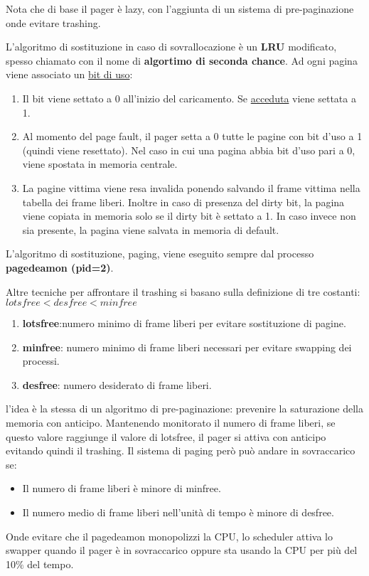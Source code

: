 \documentclass{article}
\begin{document}
\noindent Nota che di base il pager è lazy, con l'aggiunta di un sistema di pre-paginazione onde evitare trashing.
\medskip

\noindent L'algoritmo di sostituzione in caso di sovrallocazione è un \textbf{LRU} modificato, spesso chiamato con il nome di \textbf{algortimo di seconda chance}.
Ad ogni pagina viene associato un \underline{bit di uso}:
\begin{enumerate}
    \item Il bit viene settato a 0 all'inizio del caricamento. Se \underline{acceduta} viene settata a 1.
    \item Al momento del page fault, il pager setta a 0 tutte le pagine con bit d'uso a 1 (quindi viene resettato). Nel caso in cui una pagina abbia bit d'uso pari a 0,
    viene spostata in memoria centrale. 
    \item La pagine vittima viene resa invalida ponendo salvando il frame vittima nella tabella dei frame liberi. Inoltre in caso di presenza del dirty bit, la pagina viene copiata
    in memoria solo se il dirty bit è settato a 1. In caso invece non sia presente, la pagina viene salvata in memoria di default.
\end{enumerate}

\noindent L'algoritmo di sostituzione, paging, viene eseguito sempre dal processo \textbf{pagedeamon (pid=2)}.
\medskip

Altre tecniche per affrontare il trashing si basano sulla definizione di tre costanti: $lotsfree<desfree<minfree$
\begin{enumerate}
    \item \textbf{lotsfree}:numero minimo di frame liberi per evitare sostituzione di pagine.
    \item \textbf{minfree}: numero minimo di frame liberi necessari per evitare swapping dei processi.
    \item \textbf{desfree}: numero desiderato di frame liberi.
\end{enumerate}

\noindent l'idea è la stessa di un algoritmo di pre-paginazione: prevenire la saturazione della memoria con anticipo. Mantenendo monitorato il numero di frame liberi, 
se questo valore raggiunge il valore di lotsfree, il pager si attiva con anticipo evitando quindi il trashing. Il sistema di paging però può andare in sovraccarico se:
\begin{itemize}
    \item Il numero di frame liberi è minore di minfree.
    \item Il numero medio di frame liberi nell'unità di tempo è minore di desfree.
\end{itemize} 
\noindent Onde evitare che il pagedeamon monopolizzi la CPU, lo scheduler attiva lo swapper quando il pager è in sovraccarico oppure sta usando la CPU per più del 10$ \% $ del tempo.
\medskip
\end{document}
